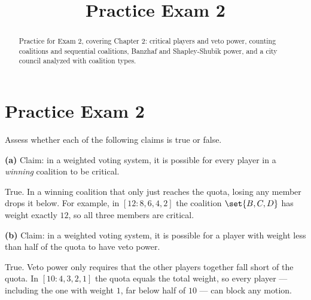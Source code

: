 \documentclass[12pt]{ximera}
\title{Practice Exam 2}
\begin{document}
\begin{abstract}
Practice for Exam 2, covering Chapter 2: critical players and veto power, counting
coalitions and sequential coalitions, Banzhaf and Shapley-Shubik power, and a city
council analyzed with coalition types.
\end{abstract}
\maketitle

\section*{Practice Exam 2}

\begin{problem}
Assess whether each of the following claims is true or false.

\begin{prompt}
\textbf{(a)} Claim: in a weighted voting system, it is possible for every player in a
\emph{winning} coalition to be critical.

\begin{multipleChoice}
\end{multipleChoice}

\begin{feedback}
True. In a winning coalition that only just reaches the quota, losing any member drops
it below. For example, in $[12:8,6,4,2]$ the coalition $\set{B,C,D}$ has weight exactly
$12$, so all three members are critical.
\end{feedback}
\end{prompt}

\begin{prompt}
\textbf{(b)} Claim: in a weighted voting system, it is possible for a player with weight
less than half of the quota to have veto power.

\begin{multipleChoice}
\end{multipleChoice}

\begin{feedback}
True. Veto power only requires that the other players together fall short of the quota.
In $[10:4,3,2,1]$ the quota equals the total weight, so every player --- including the
one with weight $1$, far below half of $10$ --- can block any motion.
\end{feedback}
\end{prompt}


\end{problem}
\end{document}
